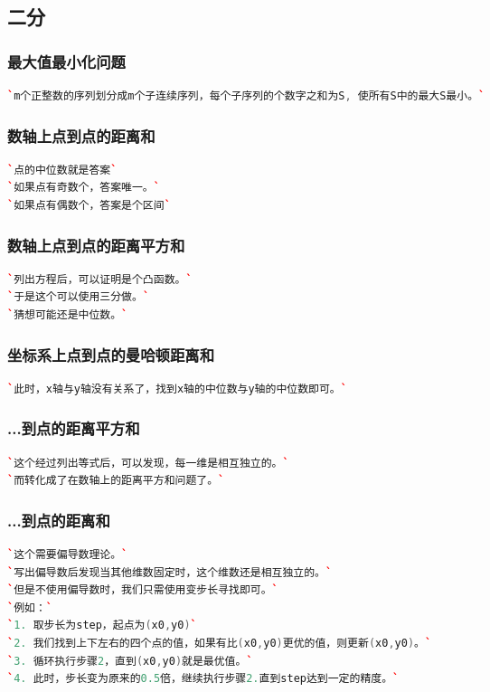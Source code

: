\documentclass[a4paper]{article}
\begin{document}
\begin{CJK*}{UTF8}{gbsn}
\begin{multicols}{3}
\begin{flushleft}
\subsection{二分}

\subsubsection{最大值最小化问题}
\begin{lstlisting}[language={c++}]
`m个正整数的序列划分成m个子连续序列，每个子序列的个数字之和为S, 使所有S中的最大S最小。`
\end{lstlisting}


\subsubsection{数轴上点到点的距离和}
\begin{lstlisting}[language={c++}]
`点的中位数就是答案`
`如果点有奇数个，答案唯一。`
`如果点有偶数个，答案是个区间`
\end{lstlisting}

\subsubsection{数轴上点到点的距离平方和}
\begin{lstlisting}[language={c++}]
`列出方程后，可以证明是个凸函数。`
`于是这个可以使用三分做。`
`猜想可能还是中位数。`
\end{lstlisting}

\subsubsection{坐标系上点到点的曼哈顿距离和}
\begin{lstlisting}[language={c++}]
`此时，x轴与y轴没有关系了，找到x轴的中位数与y轴的中位数即可。`
\end{lstlisting}

\subsubsection{...到点的距离平方和}
\begin{lstlisting}[language={c++}]
`这个经过列出等式后，可以发现，每一维是相互独立的。`
`而转化成了在数轴上的距离平方和问题了。`
\end{lstlisting}

\subsubsection{...到点的距离和}
\begin{lstlisting}[language={c++}]
`这个需要偏导数理论。`
`写出偏导数后发现当其他维数固定时，这个维数还是相互独立的。`
`但是不使用偏导数时，我们只需使用变步长寻找即可。`
`例如：`
`1. 取步长为step，起点为(x0,y0)`
`2. 我们找到上下左右的四个点的值，如果有比(x0,y0)更优的值，则更新(x0,y0)。`
`3. 循环执行步骤2，直到(x0,y0)就是最优值。`
`4. 此时，步长变为原来的0.5倍，继续执行步骤2.直到step达到一定的精度。`
\end{lstlisting}


\end{flushleft}
\end{multicols}
\end{CJK*}
\end{document}
